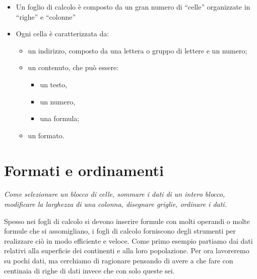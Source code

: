 \begin{itemize}
\item {} 
Un foglio di calcolo è composto da un gran numero di ``celle'' organizzate
in ``righe'' e ``colonne''

\item {} 
Ogni cella è caratterizzata da:
\begin{itemize}
\item {} 
un indirizzo, composto da una lettera o gruppo di lettere e un numero;

\item {} 
un contenuto, che può essere:
\begin{itemize}
\item {} 
un testo,

\item {} 
un numero,

\item {} 
una formula;

\end{itemize}

\item {} 
un formato.

\end{itemize}

\end{itemize}

\section{Formati e ordinamenti}
\label{05_01_f_di_calc:formati-e-ordinamenti}

\emph{Come selezionare un blocco di celle, sommare i dati di un intero blocco,
modificare la larghezza di una colonna, disegnare griglie,
ordinare i dati.}

Spesso nei fogli di calcolo si devono inserire formule con molti operandi o
molte formule che si assomigliano, i fogli di calcolo forniscono degli
strumenti per realizzare ciò in modo efficiente e veloce.
Come primo esempio partiamo dai dati relativi alla superficie dei continenti
e alla loro popolazione. Per ora lavoreremo su pochi dati, ma cerchiamo di
ragionare pensando di avere a che fare con centinaia di righe di dati
invece che con solo queste sei.

